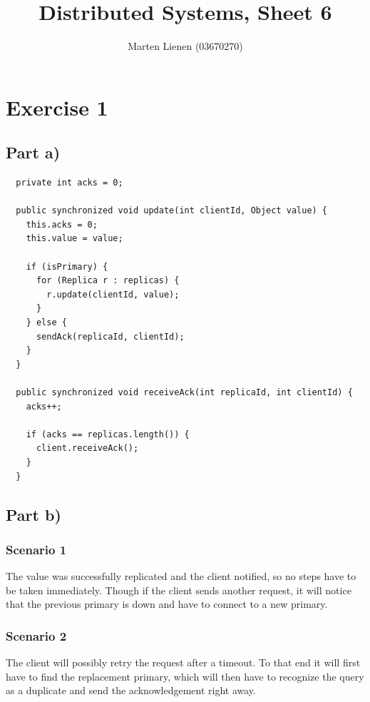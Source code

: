 \documentclass[10pt,a4paper]{article}
\title{Distributed Systems, Sheet 6}
\author{Marten Lienen (03670270)}
\begin{document}
\maketitle

\section*{Exercise 1}

\subsection*{Part a)}

\begin{verbatim}
  private int acks = 0;

  public synchronized void update(int clientId, Object value) {
    this.acks = 0;
    this.value = value;

    if (isPrimary) {
      for (Replica r : replicas) {
        r.update(clientId, value);
      }
    } else {
      sendAck(replicaId, clientId);
    }
  }

  public synchronized void receiveAck(int replicaId, int clientId) {
    acks++;

    if (acks == replicas.length()) {
      client.receiveAck();
    }
  }
\end{verbatim}

\subsection*{Part b)}

\subsubsection*{Scenario 1}

The value was successfully replicated and the client notified, so no steps have to be taken immediately.
Though if the client sends another request, it will notice that the previous primary is down and have to connect to a new primary.

\subsubsection*{Scenario 2}

The client will possibly retry the request after a timeout.
To that end it will first have to find the replacement primary, which will then have to recognize the query as a duplicate and send the acknowledgement right away.
\end{document}
